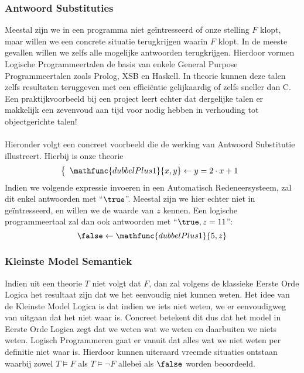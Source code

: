 \subsubsection{Antwoord Substituties}
Meestal zijn we in een programma niet geïntresseerd of onze stelling $F$ klopt, maar willen we een concrete situatie terugkrijgen waarin $F$ klopt. In de meeste gevallen willen we zelfs alle mogelijke antwoorden terugkrijgen. Hierdoor vormen Logische Programmeertalen de basis van enkele General Purpose Programmeertalen zoals Prolog, XSB en Haskell. In theorie kunnen deze talen zelfs resultaten teruggeven met een efficiëntie gelijkaardig of zelfs sneller dan C. Een praktijkvoorbeeld bij een project leert echter dat dergelijke talen er makkelijk een zevenvoud aan tijd voor nodig hebben in verhouding tot objectgerichte talen!
\paragraph{}Hieronder volgt een concreet voorbeeld die de werking van Antwoord Substitutie illustreert. Hierbij is onze theorie
\begin{equation}
\left\{\begin{array}{l}
\mathfunc{dubbelPlus1}{x,y}\leftarrow y=2\cdot x+1
\end{array}\right.
\end{equation}
Indien we volgende expressie invoeren in een Automatisch Redeneersysteem, zal dit enkel antwoorden met ``$\true$''. Meestal zijn we hier echter niet in geïntresseerd, en willen we de waarde van $z$ kennen. Een logische programmeertaal zal dan ook antwoorden met ``$\true, z=11$'':
\begin{equation}
\false\leftarrow\mathfunc{dubbelPlus1}{5,z}
\end{equation}
\subsubsection{Kleinste Model Semantiek}
Indien uit een theorie $T$ niet volgt dat $F$, dan zal volgens de klassieke Eerste Orde Logica het resultaat zijn dat we het eenvoudig niet kunnen weten. Het idee van de Kleinste Model Logica is dat indien we iets niet weten, we er eenvoudigweg van uitgaan dat het niet waar is. Concreet betekent dit dus dat het model in Eerste Orde Logica zegt dat we weten wat we weten en daarbuiten we niets weten. Logisch Programmeren gaat er vanuit dat alles wat we niet weten per definitie niet waar is. Hierdoor kunnen uiteraard vreemde situaties ontstaan waarbij zowel $T\vDash F$ als $T\vDash\neg F$ allebei als $\false$ worden beoordeeld.
